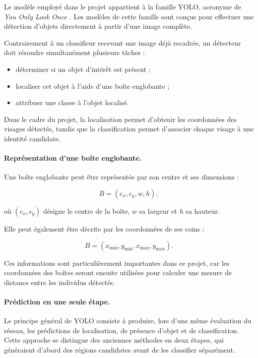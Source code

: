 \documentclass[11pt,a4paper]{report}
\begin{document}
Le modèle employé dans le projet appartient à la famille YOLO, acronyme de
\emph{You Only Look Once} \citep{redmon2016}. Les modèles de cette famille sont
conçus pour effectuer une détection d'objets directement à partir d'une image
complète.

Contrairement à un classifieur recevant une image déjà recadrée, un détecteur
doit résoudre simultanément plusieurs tâches :

\begin{itemize}
    \item déterminer si un objet d'intérêt est présent ;
    \item localiser cet objet à l'aide d'une boîte englobante ;
    \item attribuer une classe à l'objet localisé.
\end{itemize}

Dans le cadre du projet, la localisation permet d'obtenir les coordonnées des
visages détectés, tandis que la classification permet d'associer chaque visage
à une identité candidate.

\paragraph{Représentation d'une boîte englobante.}

Une boîte englobante peut être représentée par son centre et ses dimensions :

\begin{equation}
    B=(c_x,c_y,w,h),
\end{equation}

où $(c_x,c_y)$ désigne le centre de la boîte, $w$ sa largeur et $h$ sa hauteur.

Elle peut également être décrite par les coordonnées de ses coins :

\begin{equation}
    B=(x_{\min},y_{\min},x_{\max},y_{\max}).
\end{equation}

Ces informations sont particulièrement importantes dans ce projet, car les
coordonnées des boîtes seront ensuite utilisées pour calculer une mesure de
distance entre les individus détectés.

\paragraph{Prédiction en une seule étape.}

Le principe général de YOLO consiste à produire, lors d'une même évaluation du
réseau, les prédictions de localisation, de présence d'objet et de
classification. Cette approche se distingue des anciennes méthodes en deux
étapes, qui généraient d'abord des régions candidates avant de les classifier
séparément.
\end{document}

